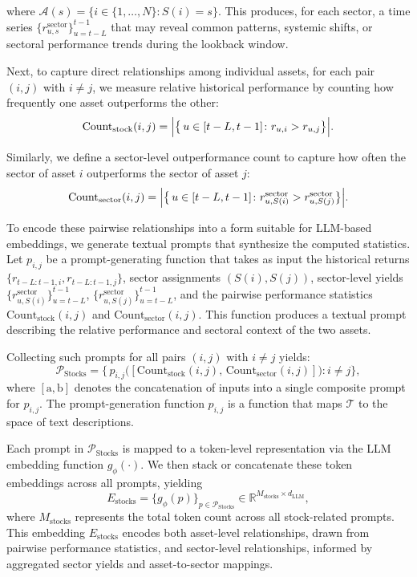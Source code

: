 where $\mathcal{A}(s) = \{ i \in \{1,\ldots,N\} : S(i)=s \}$. This produces, for each sector, a time series $\{r_{u,s}^{\text{sector}}\}_{u=t-L}^{t-1}$ that may reveal common patterns, systemic shifts, or sectoral performance trends during the lookback window. 

Next, to capture direct relationships among individual assets, for each pair $(i,j)$ with $i \neq j$, we measure relative historical performance by counting how frequently one asset outperforms the other:  
\begin{equation}
    \text{Count}_{\text{stock}}(i,j) 
    = \Bigl|\bigl\{\, u \in [t-L,t-1] \colon r_{u,i} > r_{u,j}\bigr\}\Bigr|.
    \end{equation}

Similarly, we define a sector-level outperformance count to capture how often the sector of asset $i$ outperforms the sector of asset $j$:  
\begin{equation}
    \text{Count}_{\text{sector}}(i,j)
    = \Bigl|\bigl\{\, u \in [t-L,t-1] \colon r_{u,S(i)}^{\text{sector}} > r_{u,S(j)}^{\text{sector}}\bigr\}\Bigr|.    
\end{equation}

To encode these pairwise relationships into a form suitable for LLM-based embeddings, we generate textual prompts that synthesize the computed statistics. Let $p_{i,j}$ be a prompt-generating function that takes as input the historical returns $\{r_{t-L:t-1,i}, r_{t-L:t-1,j}\}$, sector assignments $(S(i), S(j))$, sector-level yields $\{r_{u,S(i)}^{\text{sector}}\}_{u=t-L}^{t-1}$, $\{r_{u,S(j)}^{\text{sector}}\}_{u=t-L}^{t-1}$, and the pairwise performance statistics $\text{Count}_{\text{stock}}(i,j)$ and $\text{Count}_{\text{sector}}(i,j)$. This function produces a textual prompt describing the relative performance and sectoral context of the two assets.

Collecting such prompts for all pairs $(i,j)$ with $i \neq j$ yields:
\begin{equation}
        \mathcal{P}_{\text{Stocks}} 
    = \bigl\{\, p_{i,j}\bigl([\text{Count}_{\text{stock}}(i,j),\, \text{Count}_{\text{sector}}(i,j)]\bigr) 
      : i \neq j \bigr\},
\end{equation}
where $[\text{a},\text{b}]$ denotes the concatenation of inputs into a single composite prompt for $p_{i,j}$. The prompt-generation function $p_{i,j}$ is a function that maps $\mathcal{T}$ to the space of text descriptions.

Each prompt in $\mathcal{P}_{\text{Stocks}}$ is mapped to a token-level representation via the LLM embedding function $g_{\phi}(\cdot)$. We then stack or concatenate these token embeddings across all prompts, yielding
\begin{equation}
 E_{\text{stocks}} = \bigl\{g_{\phi}(p)\bigr\}_{p \in \mathcal{P}_{\text{Stocks}}} 
     \in \mathbb{R}^{M_{\text{stocks}} \times d_{\text{LLM}}},
\end{equation}
where $M_{\text{stocks}}$ represents the total token count across all stock-related prompts. This embedding $E_{\text{stocks}}$ encodes both asset-level relationships, drawn from pairwise performance statistics, and sector-level relationships, informed by aggregated sector yields and asset-to-sector mappings.

